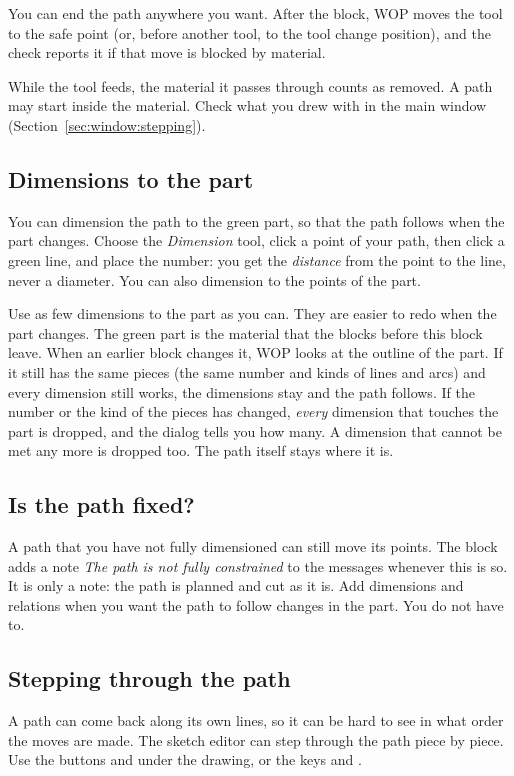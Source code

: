 You can end the path anywhere you want. After the block, WOP moves the tool to the safe point (or, before another tool, to the tool change position), and the check reports it if that move is blocked by material.

\begin{notebox}
While the tool feeds, the material it passes through counts as removed. A path may start inside the material. Check what you drew with  in the main window (Section~\ref{sec:window:stepping}).
\end{notebox}

\subsection{Dimensions to the part}
You can dimension the path to the green part, so that the path follows when the part changes. Choose the \emph{Dimension} tool, click a point of your path, then click a green line, and place the number: you get the \emph{distance} from the point to the line, never a diameter. You can also dimension to the points of the part.

\begin{warningbox}
Use as few dimensions to the part as you can. They are easier to redo when the part changes. The green part is the material that the blocks before this block leave. When an earlier block changes it, WOP looks at the outline of the part. If it still has the same pieces (the same number and kinds of lines and arcs) and every dimension still works, the dimensions stay and the path follows. If the number or the kind of the pieces has changed, \emph{every} dimension that touches the part is dropped, and the dialog tells you how many. A dimension that cannot be met any more is dropped too. The path itself stays where it is.
\end{warningbox}

\subsection{Is the path fixed?}
A path that you have not fully dimensioned can still move its points. The block adds a note \emph{The path is not fully constrained} to the messages whenever this is so. It is only a note: the path is planned and cut as it is. Add dimensions and relations when you want the path to follow changes in the part. You do not have to.

\subsection{Stepping through the path}\label{sec:blocks:pathstep}
A path can come back along its own lines, so it can be hard to see in what order the moves are made. The sketch editor can step through the path piece by piece. Use the buttons  and  under the drawing, or the keys  and .

